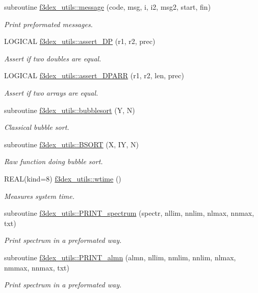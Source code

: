 \begin{DoxyCompactItemize}
\item 
subroutine \hyperlink{namespacef3dex__utils_a92226ca7c662562058c56ba005f6fc36}{f3dex\_\-utils::message} (code, msg, i, i2, msg2, start, fin)
\begin{DoxyCompactList}\small\item\em Print preformated messages. \end{DoxyCompactList}\item 
LOGICAL \hyperlink{namespacef3dex__utils_ad4cb6613ee589637f453ef808466a0f9}{f3dex\_\-utils::assert\_\-DP} (r1, r2, prec)
\begin{DoxyCompactList}\small\item\em Assert if two doubles are equal. \end{DoxyCompactList}\item 
LOGICAL \hyperlink{namespacef3dex__utils_a234414d8daaf5e3bfd03754331b467ed}{f3dex\_\-utils::assert\_\-DPARR} (r1, r2, len, prec)
\begin{DoxyCompactList}\small\item\em Assert if two arrays are equal. \end{DoxyCompactList}\item 
subroutine \hyperlink{namespacef3dex__utils_aa75468d58041cdc91e52ce3fadb073b3}{f3dex\_\-utils::bubblesort} (Y, N)
\begin{DoxyCompactList}\small\item\em Classical bubble sort. \end{DoxyCompactList}\item 
subroutine \hyperlink{namespacef3dex__utils_a2cce76cb1a695da8315cbf60507ec322}{f3dex\_\-utils::BSORT} (X, IY, N)
\begin{DoxyCompactList}\small\item\em Raw function doing bubble sort. \end{DoxyCompactList}\item 
REAL(kind=8) \hyperlink{namespacef3dex__utils_ac5aa172010ec6cd9bd4c5273904b0405}{f3dex\_\-utils::wtime} ()
\begin{DoxyCompactList}\small\item\em Measures system time. \end{DoxyCompactList}\item 
subroutine \hyperlink{namespacef3dex__utils_a8b9740b049b3d24092401ae075810f51}{f3dex\_\-utils::PRINT\_\-spectrum} (spectr, nllim, nnlim, nlmax, nnmax, txt)
\begin{DoxyCompactList}\small\item\em Print spectrum in a preformated way. \end{DoxyCompactList}\item 
subroutine \hyperlink{namespacef3dex__utils_aeba2230de9ec307ae71577d102a0d91d}{f3dex\_\-utils::PRINT\_\-almn} (almn, nllim, nmlim, nnlim, nlmax, nmmax, nnmax, txt)
\begin{DoxyCompactList}\small\item\em Print spectrum in a preformated way. \end{DoxyCompactList}\end{DoxyCompactItemize}
